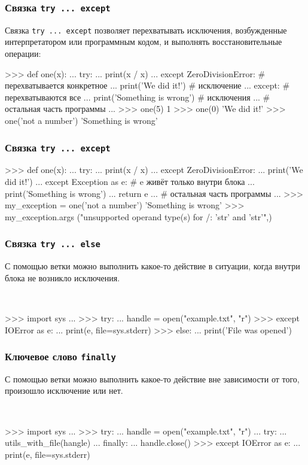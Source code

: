 \documentclass[fleqn, xcolor=x11names]{beamer}
\begin{document}
\begin{frame}[fragile]\frametitle{Связка  \texttt{try ... except}}
Связка \texttt{try ... except} позволяет перехватывать исключения, возбужденные интерпретатором или программным кодом, и выполнять восстановительные операции:
\begin{pcode}
>>> def one(x):
...    try:
...        print(x / x)
...    except ZeroDivisionError: # перехватывается конкретное 
...        print('We did it!')         # исключение
...    except:                   # перехватываются все 
...        print('Something is wrong') # исключения
...    # остальная часть программы
...
>>> one(5) 
1
>>> one(0)
'We did it!'
>>> one('not a number')
'Something is wrong'
\end{pcode}
\end{frame}

\begin{frame}[fragile]\frametitle{Связка  \texttt{try ... except}}
\begin{pcode}
>>> def one(x):
...    try:
...        print(x / x)
...    except ZeroDivisionError:  
...        print('We did it!')       
...    except Exception as e: # e живёт только внутри блока           
...        print('Something is wrong')
...        return e
...    # остальная часть программы
...
>>> my_exception = one('not a number')
'Something is wrong'
>>> my_exception.args
("unsupported operand type(s) for /: 'str' and 'str'",)
\end{pcode}
\end{frame}

\begin{frame}[fragile]\frametitle{Связка  \texttt{try ... else}}
С помощью ветки  можно выполнить какое-то
действие в ситуации, когда внутри  блока не возникло
исключения.

\

\begin{pcode}
>>> import sys
...
>>> try:
...     handle = open("example.txt", "r")
>>> except IOError as e:
...     print(e, file=sys.stderr)
>>> else:
...     print('File was opened')
\end{pcode}

\end{frame}

\begin{frame}[fragile]\frametitle{Ключевое слово \texttt{finally}}
С помощью ветки  можно выполнить какое-то действие вне
зависимости от того, произошло исключение или нет.

\

\begin{pcode}
>>> import sys
...
>>> try:
...     handle = open("example.txt", "r")
...     try:
...         utils_with_file(hangle)
...     finally:
...         handle.close()
>>> except IOError as e:
...     print(e, file=sys.stderr)
\end{pcode}
\end{frame}
\end{document}
